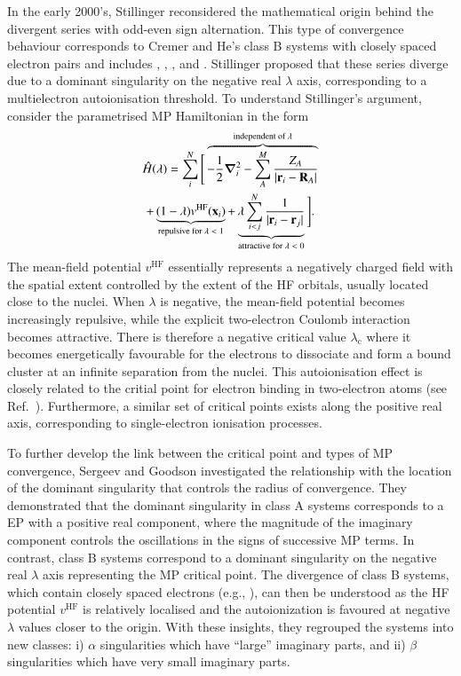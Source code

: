\documentclass[aps,prb,reprint,noshowkeys,superscriptaddress]{revtex4-1}
\newcommand{\latin}[1]{#1}
\newcommand{\eg}{\latin{e.g.}}
\newcommand{\Ne}{N} %
\newcommand{\Nn}{M} %
\newcommand{\hH}{\Hat{H}}
\newcommand{\lc}{\lambda_{\text{c}}}
\begin{document}
In the early 2000's, Stillinger reconsidered the mathematical origin behind the divergent series with odd-even
sign alternation.\cite{Stillinger_2000} 
This type of convergence behaviour corresponds to Cremer and He's class B systems with closely spaced
electron pairs and includes , , , and .\cite{Cremer_1996}
Stillinger proposed that these series diverge due to a dominant singularity
on the negative real $\lambda$ axis, corresponding to a multielectron autoionisation threshold.\cite{Stillinger_2000}
To understand Stillinger's argument, consider the parametrised MP Hamiltonian in the form
\begin{multline}
\label{eq:HamiltonianStillinger}
    \hH(\lambda) = 
    \sum_{i}^{\Ne} \Bigg[ 
    \overbrace{-\frac{1}{2}\grad_i^2 
    - \sum_{A}^{\Nn} \frac{Z_A}{\abs{\vb{r}_i-\vb{R}_A}}}^{\text{independent of $\lambda$}}
    \\
    + \underbrace{(1-\lambda)v^{\text{HF}}(\vb{x}_i)}_{\text{repulsive for $\lambda < 1$}}
    + \underbrace{\lambda\sum_{i<j}^{\Ne}\frac{1}{|\vb{r}_i-\vb{r}_j|}}_{\text{attractive for $\lambda < 0$}}
    \Bigg].
\end{multline}
The mean-field potential $v^{\text{HF}}$ essentially represents a negatively charged field with the spatial extent
controlled by the extent of the HF orbitals, usually located close to the nuclei.
When $\lambda$ is negative, the mean-field potential becomes increasingly repulsive, while the explicit two-electron 
Coulomb interaction becomes attractive.
There is therefore a negative critical value $\lc$ where it becomes energetically favourable for the electrons 
to dissociate and form a bound cluster at an infinite separation from the nuclei.\cite{Stillinger_2000}
This autoionisation effect is closely related to the critial point for electron binding in two-electron 
atoms (see Ref.~).
Furthermore, a similar set of critical points exists along the positive real axis, corresponding to single-electron ionisation
processes.\cite{Sergeev_2005}


To further develop the link between the critical point and types of MP convergence, Sergeev and Goodson investigated
the relationship with the location of the dominant singularity that controls the radius of convergence.\cite{Goodson_2004}
They demonstrated that the dominant singularity in class A systems corresponds to a EP with a positive real component, 
where the magnitude of the imaginary component controls the oscillations in the signs of successive MP 
terms.\cite{Goodson_2000a,Goodson_2000b}
In contrast, class B systems correspond to a dominant singularity on the negative real $\lambda$ axis representing
the MP critical point.
The divergence of class B systems, which contain closely spaced electrons (\eg, ), can then be understood as the 
HF potential $v^{\text{HF}}$ is relatively localised and the autoionization is favoured at negative 
$\lambda$ values closer to the origin.
With these insights, they regrouped the systems into new classes: i) $\alpha$ singularities which have ``large'' imaginary parts, 
and ii) $\beta$ singularities which have very small imaginary parts.\cite{Goodson_2004,Sergeev_2006} 
\end{document}
